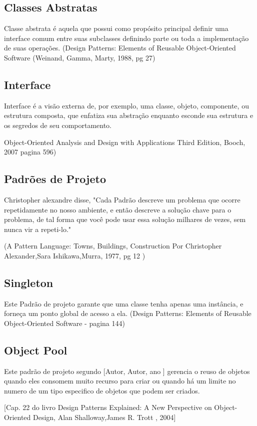 \subsection{Classes Abstratas}	

Classe abstrata é aquela que possui como propósito principal definir uma interface comum entre suas subclasses definindo parte ou toda a implementação de suas operações.
(Design Patterns: Elements of Reusable Object-Oriented Software (Weinand, Gamma, Marty, 1988, pg 27)


\subsection{Interface}	

Interface é a visão externa de, por exemplo, uma classe, objeto, componente, ou estrutura composta, que enfatiza sua abstração enquanto esconde sua estrutura e os segredos de seu comportamento.

Object-Oriented Analysis and Design with Applications Third Edition, Booch, 2007 pagina 596) 

\subsection{Padrões de Projeto}	
Christopher alexandre disse, "Cada Padrão descreve um problema que ocorre repetidamente no nosso ambiente, e então descreve a solução chave para o problema, de tal forma que você pode usar essa solução milhares de vezes, sem nunca vir a repeti-lo."

(A Pattern Language: Towns, Buildings, Construction Por Christopher Alexander,Sara Ishikawa,Murra, 1977, pg 12 )


\subsection{Singleton}	
Este Padrão de projeto garante que uma classe tenha apenas uma instância, e forneça um ponto global de acesso a ela.  
(Design Patterns: Elements of Reusable Object-Oriented Software - pagina 144)


\subsection{Object Pool}	
Este padrão de projeto segundo [Autor, Autor, ano ] gerencia o reuso de objetos quando eles consomem muito recurso para criar ou quando há um limite no numero de um tipo especifico de objetos que podem ser criados.

[Cap. 22 do livro Design Patterns Explained: A New Perspective on Object-Oriented Design, Alan Shalloway,James R. Trott ,  2004]